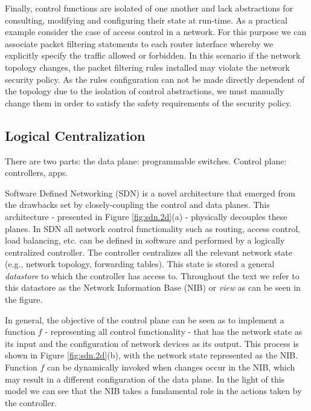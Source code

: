 
Finally, control functions are isolated of one another and lack
abstractions for consulting, modifying and configuring their state at
run-time. As a practical example consider the case of access control
in a network. For this purpose we can associate packet filtering
statements to each router interface whereby we
explicitly specify the traffic allowed or forbidden. In this scenario
if the network topology changes, the packet filtering rules installed
may violate  the network security policy. As the rules configuration
can not be made directly dependent of the topology due to the
isolation of control abstractions, we must manually change them in
order to satisfy the safety requirements of the security policy.  


\subsection{Logical Centralization} 
There are two parts: the data plane: programmable switches. Control plane: controllers, apps. 

 Software Defined Networking (SDN) is a novel architecture that emerged from the drawbacks set by closely-coupling the control and data planes. This architecture - presented in  Figure \ref{fig:sdn.2d}(a) - physically decouples these planes. In SDN all network control functionality  such as routing, access control, load balancing, etc. can be defined in software and performed by a logically centralized controller. The controller centralizes all the relevant network state (e.g., network topology, forwarding tables). This state is stored a general \emph{datastore} to which the controller has access to. Throughout the text we refer to this datastore as the Network Information Base (NIB) or \emph{view} as can be seen in the figure. 

In general, the objective of the control plane can be seen as to
implement a function $f$ - representing all control functionality -
that has the network state as its input and the configuration of
network devices as its output. This process is shown in Figure
\ref{fig:sdn.2d}(b), with the network state represented as the
NIB. Function $f$ can be dynamically invoked when changes occur in the
NIB, which may result in a different configuration of the data
plane. In the light of this model we can see that the NIB takes a
fundamental role in the actions taken by the controller. 


